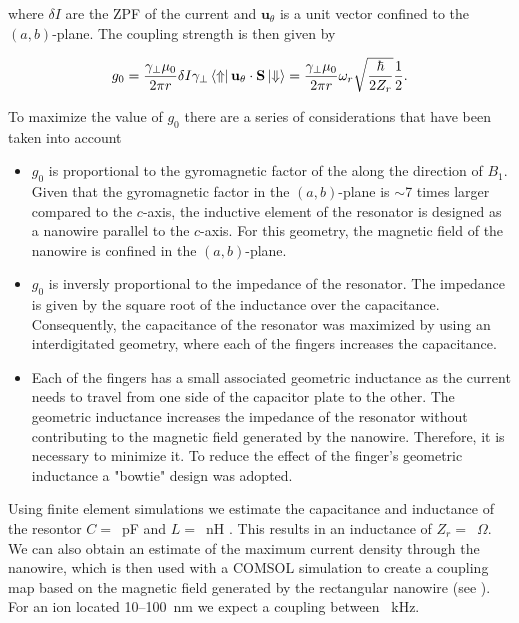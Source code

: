 \noindent where $\delta I$ are the ZPF of the current and $\mathbf{u}_\theta$ is a unit vector confined to the $(a, b)$-plane. The coupling strength is then given by

\begin{align}
\begin{split}
    g_0 = \frac{\gamma_\perp \mu_0}{2 \pi r} \delta I \gamma_\perp \bra{\Uparrow}  \mathbf{u}_\theta \cdot \mathbf{S} \ket{\Downarrow} = \frac{\gamma_\perp \mu_0}{2 \pi r} \omega_r \sqrt{\frac{\hbar}{2Z_r}} \frac{1}{2}.
\end{split}
\end{align}

To maximize the value of $g_0$ there are a series of considerations that have been taken into account

\begin{itemize}
    \item $g_0$ is proportional to the gyromagnetic factor of the \Er along the direction of $B_1$. Given that the gyromagnetic factor in the $(a, b)$-plane is $\sim$7 times larger compared to the $c$-axis, the inductive element of the resonator is designed as a nanowire parallel to the $c$-axis. For this geometry, the magnetic field of the nanowire is confined in the $(a, b)$-plane. 
    \item $g_0$ is inversly proportional to the impedance of the resonator. The impedance is given by the square root of the inductance over the capacitance. Consequently, the capacitance of the resonator was maximized by using an interdigitated geometry, where each of the fingers increases the capacitance.
    \item Each of the fingers has a small associated geometric inductance as the current needs to travel from one side of the capacitor plate to the other. The geometric inductance increases the impedance of the resonator without contributing to the magnetic field generated by the nanowire. Therefore, it is necessary to minimize it. To reduce the effect of the finger's geometric inductance a "bowtie" design was adopted.
\end{itemize} 

Using finite element simulations we estimate the capacitance and inductance of the resontor $C=$~pF and $L=$~nH . This results in an inductance of $Z_r=$~$\Omega$. We can also obtain an estimate of the maximum current density through the nanowire, which is then used with a COMSOL simulation to create a coupling map based on the magnetic field generated by the rectangular nanowire (see ). For an \Er ion located 10--100~nm we expect a coupling between ~kHz.


